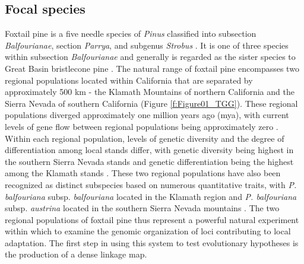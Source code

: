 \documentclass[11pt]{article}
\begin{document}
\subsection*{Focal species}
Foxtail pine is a five needle species of \textit{Pinus} classified into 
subsection \textit{Balfourianae}, section \textit{Parrya}, and subgenus \textit{Strobus} 
\citep{Gernandt:2005}. It is one of three species within subsection \textit{Balfourianae} 
\citep{Bailey:1970} and generally is regarded as the sister species to Great Basin bristlecone pine \citep[\textit{P. longaeva} D. K. Bailey; see][] 
{Eckert:2006a}. The natural range of foxtail pine encompasses two 
regional populations located within California that are separated by approximately 500 km - 
the Klamath Mountains of northern California and the Sierra Nevada of southern California 
(Figure \ref{f:Figure01_TGG}). These regional populations diverged approximately one million years ago (mya), 
with current levels of gene flow between regional populations being approximately zero 
\citep{Eckert:2008}. Within each regional population, levels of genetic diversity and the 
degree of differentiation among local stands differ, with genetic diversity being highest in 
the southern Sierra Nevada stands and genetic differentiation being the highest among the 
Klamath stands \citep{Oline:2000, Eckert:2008}. These two regional populations
have also been recognized as distinct subspecies based on numerous quantitative traits, with \textit{P. balfouriana}
subsp. \textit{balfouriana} located in the Klamath region and \textit{P. balfouriana} subsp. \textit{austrina} located in the southern
Sierra Nevada mountains \citep{Mastrogiuseppe:1980}. The two regional populations of foxtail pine 
thus represent a powerful natural experiment within which to examine the genomic organization of loci contributing to local adaptation. The first step
in using this system to test evolutionary hypotheses is the production of a
dense linkage map.
\end{document}
